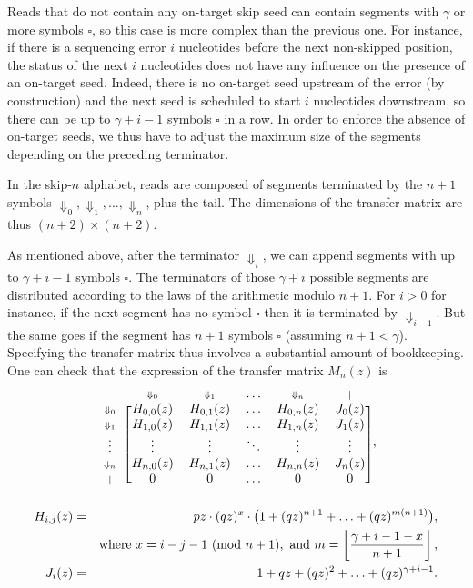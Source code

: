\documentclass{article}
\newcommand{\Dn}[1]{\scriptstyle{\Downarrow_{#1}}}
\newcommand{\nd}{\scriptstyle{|}}
\newcommand{\modulo}[1]{\ (\mathrm{mod}\ #1)}
\begin{document}
Reads that do not contain any on-target skip seed can contain segments
with $\gamma$ or more symbols $\square$, so this case is more complex than
the previous one. For instance, if there is a sequencing error $i$
nucleotides before the next non-skipped position, the status of the next
$i$ nucleotides does not have any influence on the presence of an
on-target seed. Indeed, there is no on-target seed upstream of the error
(by construction) and the next seed is scheduled to start $i$ nucleotides
downstream, so there can be up to $\gamma+i-1$ symbols $\square$ in a row.
In order to enforce the absence of on-target seeds, we thus have to adjust
the maximum size of the segments depending on the preceding terminator.

In the skip-$n$ alphabet, reads are composed of segments terminated by the
$n+1$ symbols $\Downarrow_0, \Downarrow_1, \ldots, \Downarrow_n$, plus the
tail. The dimensions of the transfer matrix are thus $(n+2) \times (n+2)$.

As mentioned above, after the terminator $\Downarrow_i$, we can append
segments with up to $\gamma+i-1$ symbols $\square$. The terminators of
those $\gamma+i$ possible segments are distributed according to the laws
of the arithmetic modulo $n+1$. For $i > 0$ for instance, if the next
segment has no symbol $\square$ then it is terminated by
$\Downarrow_{i-1}$. But the same goes if the segment has $n+1$ symbols
$\square$ (assuming $n+1 < \gamma$). Specifying the transfer matrix thus
involves a substantial amount of bookkeeping. One can check that the
expression of the transfer matrix $M_n(z)$ is
\begin{equation*}
\begin{blockarray}{cccccc}
   & \Dn{0} & \Dn{1} & \ldots & \Dn{n} & \nd \\
\begin{block}{c[ccccc]}
\Dn{0} & H_{0,0}(z) & H_{0,1}(z) & \ldots & H_{0,n}(z) & J_0(z) \\
\Dn{1} & H_{1,0}(z) & H_{1,1}(z) & \ldots & H_{1,n}(z) & J_1(z) \\
\vdots & \vdots & \vdots & \ddots & \vdots & \vdots \\
\Dn{n} & H_{n,0}(z) & H_{n,1}(z) & \ldots & H_{n,n}(z) & J_n(z) \\
\nd & 0 & 0 & \ldots & 0 & 0 \\
\end{block}
\end{blockarray},
\end{equation*}
\begin{eqnarray}
H_{i,j}(z) &=& pz \cdot (qz)^x \cdot \big( 1 + (qz)^{n+1} +
  \ldots + (qz)^{m(n+1)} \big), \\
\notag
  &\;& \text{where } x = i-j-1 \modulo{n+1},
  \text{ and } m = \left\lfloor
  \frac{\gamma+i-1-x}{n+1} \right\rfloor, \\
J_i(z) &=& 1 + qz + (qz)^2 + \ldots + (qz)^{\gamma+i-1}.
\end{eqnarray}
\end{document}
